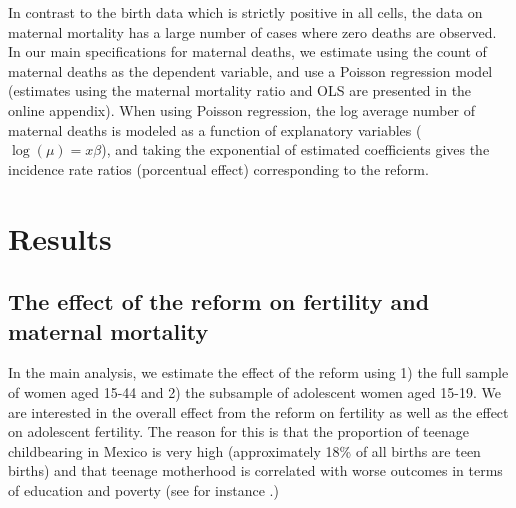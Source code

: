 \documentclass[a4paper, 11pt]{article}
\begin{document}
\begin{spacing}{2}
In contrast to the birth data which is strictly positive in all cells, the data on maternal mortality has a large number of cases where zero deaths are observed.  In our main specifications for maternal deaths, we estimate using the count of maternal deaths as the dependent variable, and use a Poisson regression model (estimates using the maternal mortality ratio and OLS are presented in the online appendix).%
When using Poisson regression, the log average number of maternal deaths is modeled as a function of explanatory variables ($\log(\mu) =x\beta$), and taking the exponential of estimated coefficients gives the incidence rate ratios (porcentual effect) corresponding to the reform.

\section{Results}\label{scn:results}
\subsection{The effect of the reform on fertility and maternal mortality}\label{main}
In the main analysis, we estimate the effect of the reform using 1) the full sample of women aged 15-44 and 2) the subsample of adolescent women aged 15-19. We are interested in the overall effect from the reform on fertility as well as the effect on adolescent fertility. The reason for this is that the proportion of teenage childbearing in Mexico is very high (approximately 18\% of all births are teen births) and that teenage motherhood is correlated with worse outcomes in terms of education and poverty (see for instance \citep{furstenberg1976unplanned}.) 


\end{spacing}
\end{document}
